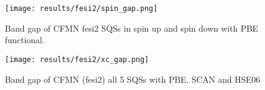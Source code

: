 \begin{comment}
\begin{table}[H]
\centering
\begin{tabular}{@{}cccc@{}}
\toprule
Structure  & Spin-up & Spin-down & Total  \\ \midrule
\textbf{A} & 0.0814  & 0.0522    & 0.0281 \\
\textbf{B} & 0.2932  & 0.0523    & 0.0523 \\
\textbf{C} & 0.2355  & 0.0343    & 0.0343 \\
\textbf{D} & 0.3386  & 0         & 0      \\
\textbf{E} & 0.3078  & 0.0495    & 0.0495 \\ \bottomrule
\end{tabular}
\caption{Band gap (GGA) in spin up and spin down channels of CFMNSi2 structures}
\end{table}

\begin{table}[H]
\centering
\begin{tabular}{@{}cccc@{}}
\toprule
Structure  & PBE    & SCAN   & HSE06  \\ \midrule
\textbf{A} & 0.0281 & 0.0000 & 0.0207 \\
\textbf{B} & 0.0523 & 0.0890 & 0.1808 \\
\textbf{C} & 0.0344 & 0.0690 & 0.0196 \\
\textbf{D} & 0.0000 & 0.0000 & 0.0000 \\
\textbf{E} & 0.0495 & 0.1048 & 0.0133 \\ \bottomrule
\end{tabular}
\caption{Band gap of $CFMN (FeSi_2)$ SQSs with GGA (PBE), meta-GGA (SCAN) and hybrid-functionals (HSE06). \textbf{Add footnote to explain the uncertainty in these results regarding smearing type and width, and DOS and EIGENVAL}}
\end{table}
\end{comment}


\begin{figure}[H]
\centering
\texttt{[image: results/fesi2/spin\_gap.png]}
\caption{Band gap of CFMN fesi2 SQSs in spin up and spin down with PBE functional.}
\label{DOS_hse06_B}
\end{figure}

\begin{figure}[H]
\centering
\texttt{[image: results/fesi2/xc\_gap.png]}
\caption{Band gap of CFMN (fesi2) all 5 SQSs with PBE, SCAN and HSE06}
\label{Xc_fig}
\end{figure}



